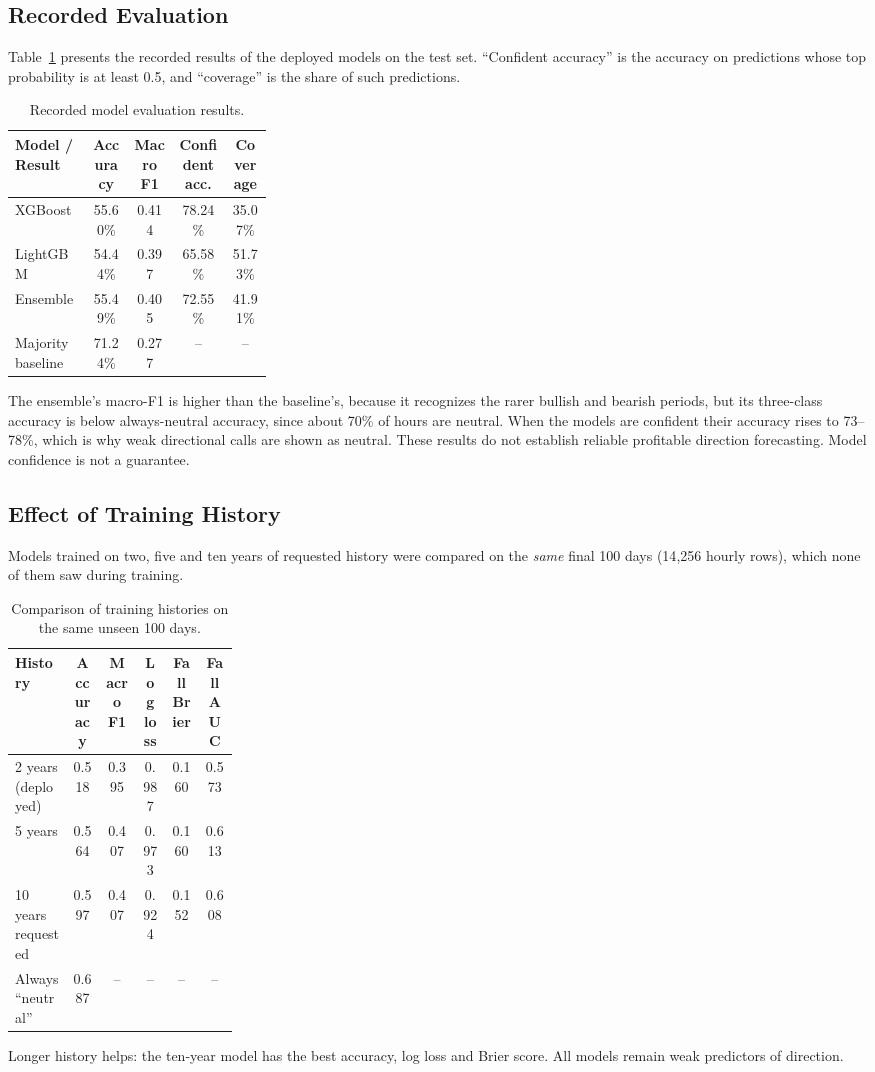 \subsection{Recorded Evaluation}
Table~\ref{tab:eval} presents the recorded results of the deployed models on the test set. ``Confident accuracy'' is the accuracy on predictions whose top probability is at least 0.5, and ``coverage'' is the share of such predictions.
\begin{table}[H]\centering
\renewcommand{\arraystretch}{1.3}
\begin{tabular}{|p{0.30\linewidth}|c|c|c|c|}\hline
\textbf{Model / Result} & \textbf{Accuracy} & \textbf{Macro F1} & \textbf{Confident acc.} & \textbf{Coverage}\\\hline
XGBoost & 55.60\% & 0.414 & 78.24\% & 35.07\%\\\hline
LightGBM & 54.44\% & 0.397 & 65.58\% & 51.73\%\\\hline
Ensemble & 55.49\% & 0.405 & 72.55\% & 41.91\%\\\hline
Majority baseline & 71.24\% & 0.277 & -- & --\\\hline
\end{tabular}
\caption{Recorded model evaluation results.}\label{tab:eval}
\end{table}
The ensemble's macro-F1 is higher than the baseline's, because it recognizes the rarer bullish and bearish periods, but its three-class accuracy is below always-neutral accuracy, since about 70\% of hours are neutral. When the models are confident their accuracy rises to 73--78\%, which is why weak directional calls are shown as neutral. These results do not establish reliable profitable direction forecasting. Model confidence is not a guarantee.

\subsection{Effect of Training History}
Models trained on two, five and ten years of requested history were compared on the \textit{same} final 100 days (14{,}256 hourly rows), which none of them saw during training.
\begin{table}[H]\centering
\renewcommand{\arraystretch}{1.3}
\begin{tabular}{|p{0.26\linewidth}|c|c|c|c|c|}\hline
\textbf{History} & \textbf{Accuracy} & \textbf{Macro F1} & \textbf{Log loss} & \textbf{Fall Brier} & \textbf{Fall AUC}\\\hline
2 years (deployed) & 0.518 & 0.395 & 0.987 & 0.160 & 0.573\\\hline
5 years & 0.564 & 0.407 & 0.973 & 0.160 & 0.613\\\hline
10 years requested & 0.597 & 0.407 & 0.924 & 0.152 & 0.608\\\hline
Always ``neutral'' & 0.687 & -- & -- & -- & --\\\hline
\end{tabular}
\caption{Comparison of training histories on the same unseen 100 days.}\label{tab:history}
\end{table}
Longer history helps: the ten-year model has the best accuracy, log loss and Brier score. All models remain weak predictors of direction.


